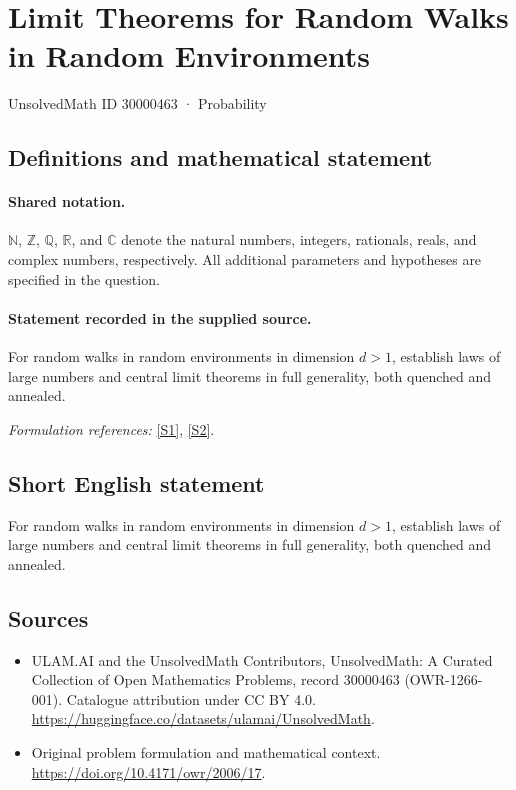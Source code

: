 \documentclass[11pt]{article}
\newcommand{\sref}[2]{\hyperlink{source:#1:#2}{[S#2]}}
\begin{document}
\setcounter{section}{30000462}
\section{Limit Theorems for Random Walks in Random Environments}\label{30000463}
{\small UnsolvedMath ID 30000463 · Probability}
\subsection{Definitions and mathematical statement}

\paragraph{Shared notation.}$\mathbb N$, $\mathbb Z$, $\mathbb Q$, $\mathbb R$, and $\mathbb C$ denote the natural numbers, integers, rationals, reals, and complex numbers, respectively. All additional parameters and hypotheses are specified in the question.


\paragraph{Statement recorded in the supplied source.}
For random walks in random environments in dimension $d>1$, establish laws of large numbers and central limit theorems in full generality, both quenched and annealed.
\par\smallskip\textit{Formulation references:} \sref{30000463}{1}, \sref{30000463}{2}.
\subsection{Short English statement}
For random walks in random environments in dimension $d>1$, establish laws of large numbers and central limit theorems in full generality, both quenched and annealed.
\subsection{Sources}
\begin{itemize}
\item[\hypertarget{source:30000463:1}{S1}] ULAM.AI and the UnsolvedMath Contributors, UnsolvedMath: A Curated Collection of Open Mathematics Problems, record 30000463 (OWR-1266-001). Catalogue attribution under CC BY 4.0.
\url{https://huggingface.co/datasets/ulamai/UnsolvedMath}.
\item[\hypertarget{source:30000463:2}{S2}] Original problem formulation and mathematical context.
\url{https://doi.org/10.4171/owr/2006/17}.
\end{itemize}
\label{end:30000463}
\end{document}
